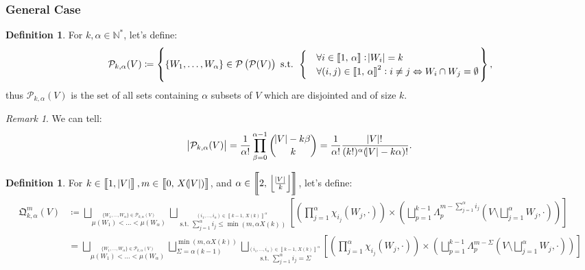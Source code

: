\documentclass{article}
\theoremstyle{definition}
\newtheorem{definition}[lemma]{Definition}
\theoremstyle{remark}
\newtheorem*{remark}{Remark}
\newcommand{\N}{\mathbb N}
\newcommand{\intint}[2]{\left\llbracket#1, \, #2\right\rrbracket}
\newcommand{\floor}[1]{\left\lfloor#1\right\rfloor}
\newcommand{\st}{\text{ s.t. }}
\begin{document}
		\subsubsection{General Case}
			\begin{definition} For $k, \alpha \in \N^*$, let's define:
			\[\mathcal P_{k,\alpha}(V) \coloneqq \left\{\{W_1, \ldots, W_\alpha\} \in \mathcal P\left(\mathcal P(V)\right) \st
				\begin{cases}
						&\forall i \in \intint 1\alpha : \abs {W_i} = k \\
						&\forall (i, j) \in \intint 1\alpha^2 : i \neq j \Leftrightarrow W_i \cap W_j = \emptyset
					\end{cases}
			\right\},\]
			thus $\mathcal P_{k,\alpha}(V)$ is the set of all sets containing $\alpha$ subsets of $V$ which are disjointed and of size $k$.
			\end{definition}

			\begin{remark} We can tell:
			\[\abs {\mathcal P_{k,\alpha}(V)} = \frac 1{\alpha!}\prod_{\beta=0}^{\alpha-1}\binom {\abs V-k\beta}k = \frac 1{\alpha!}\frac {\abs V!}{(k!)^\alpha(\abs V-k\alpha)!}.\]
			\end{remark}

			\begin{definition} For $k \in \intint 1{\abs V}, m \in \intint 0{X(\abs V)}$, and $\alpha \in \intint 2{\floor {\frac {\abs V}k}}$, let's define:
			\begin{align*}
				\mathfrak Q_{k,\alpha}^m(V) &\coloneqq
						\bigsqcup_{\stackrel {\{W_1, \ldots, W_\alpha\} \in \mathcal P_{k,\alpha}(V)}{\mu(W_1) < \ldots < \mu(W_\alpha)}}
							\bigsqcup_{\stackrel {(i_1, \ldots, i_\alpha) \in \intint {k-1}{X(k)}^\alpha}{\st \sum_{j=1}^\alpha i_j \leq \min\left(m, \alpha X(k)\right)}}
							\left[\left(\prod_{j=1}^\alpha \chi_{i_j}(W_j, \cdot)\right) \times \left(\bigsqcup_{p=1}^{k-1}
								\Lambda_p^{m-\sum_{j=1}^\alpha i_j}\left(V \setminus \bigsqcup_{j=1}^\alpha W_j, \cdot\right)\right)\right] \\
					&= \bigsqcup_{\stackrel {\{W_1, \ldots, W_\alpha\} \in \mathcal P_{k,\alpha}(V)}{\mu(W_1) < \ldots < \mu(W_\alpha)}}
						\bigsqcup_{\Sigma=\alpha(k-1)}^{\min\left(m, \alpha X(k)\right)}
						\bigsqcup_{\stackrel {(i_1, \ldots, i_\alpha) \in \intint {k-1}{X(k)}^\alpha}{\st \sum_{j=1}^\alpha i_j = \Sigma}}
							\left[\left(\prod_{j=1}^\alpha \chi_{i_j}(W_j, \cdot)\right) \times \left(\bigsqcup_{p=1}^{k-1}
								\Lambda_p^{m-\Sigma}\left(V \setminus \bigsqcup_{j=1}^\alpha W_j, \cdot\right)\right)\right]
			\end{align*}
			\end{definition}
\end{document}
